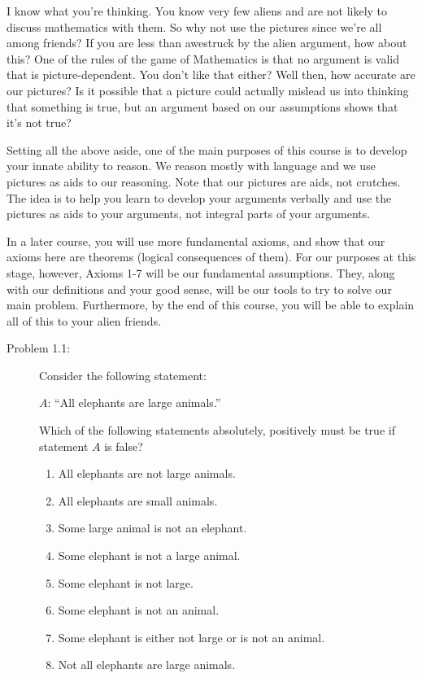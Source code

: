 \documentclass[english]{book}
\begin{document}
I know what you're thinking. You know very few aliens and are not likely to discuss mathematics with them. So why not use the pictures since we're all among friends? If you are less than awestruck by the alien argument, how about this? One of the rules of the game of Mathematics is that no argument is valid that is picture-dependent. You don't like that either? Well then, how accurate are our pictures? Is it possible that a picture could actually mislead us into thinking that something is true, but an argument based on our assumptions shows that it's not true? 

Setting all the above aside, one of the main purposes of this course is to develop your innate ability to reason. We reason mostly with language and we use pictures as aids to our reasoning. Note that our pictures are aids, not crutches. The idea is to help you learn to develop your arguments verbally and use the pictures as aids to your arguments, not integral parts of your arguments.

In a later course, you will use more fundamental axioms, and show that our axioms here are theorems (logical consequences of them). For our purposes at this stage, however, Axioms 1-7 will be our fundamental assumptions. They, along with our definitions and your good sense, will be our tools to try to solve our main problem. Furthermore, by the end of this course, you will be able to explain all of this to your alien friends.

\begin{description}
\item[Problem 1.1:] Consider the following statement: 

  $A$: ``All elephants are large animals.''

  Which of the following statements absolutely, positively must be true if statement $A$ is false?
  \begin{enumerate}[\hspace{1cm}(a)]
    \item All elephants are not large animals.
    \item All elephants are small animals.
    \item Some large animal is not an elephant.
    \item Some elephant is not a large animal.
    \item Some elephant is not large.
    \item Some elephant is not an animal.
    \item Some elephant is either not large or is not an animal.
    \item Not all elephants are large animals.
  \end{enumerate}
\end{description}
\end{document}
